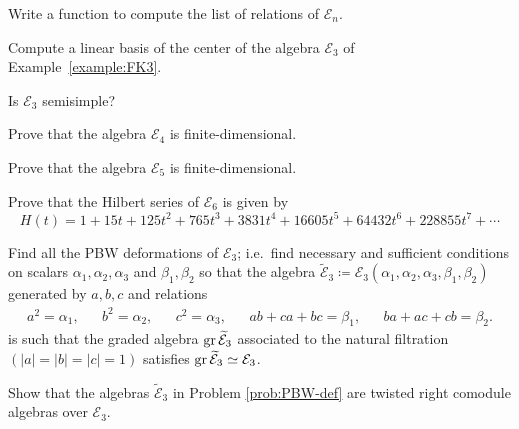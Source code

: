 \begin{prob}
Write a function to compute the list of relations of $\mathcal{E}_n$.
\end{prob}

\begin{prob}
	Compute a linear basis of the center of the algebra $\mathcal{E}_3$ of
	Example~\ref{example:FK3}. 
\end{prob}

\begin{prob}
	Is $\mathcal{E}_3$ semisimple?
\end{prob}

\begin{prob}
	\label{problem:FK4}
	Prove that the algebra $\mathcal{E}_4$ is finite-dimensional.
\end{prob}

\begin{prob}
	\label{problem:FK5}
	Prove that the algebra $\mathcal{E}_5$ is finite-dimensional.
\end{prob}

\begin{prob}
	\label{problem:FK6}
	Prove that the Hilbert series of $\mathcal{E}_6$ is given by
	\[
	H(t)=1+15t+125t^2+765t^3+3831t^4+16605t^5+64432t^6+228855t^7+\cdots
	\]
\end{prob}

\begin{prob}\label{prob:PBW-def}
Find all the PBW deformations of $\mathcal{E}_3$; i.e.~find necessary and sufficient conditions on scalars $\alpha_1,\alpha_2,\alpha_3$ and $\beta_1,\beta_2$ so that the algebra $\widetilde{\mathcal{E}}_3\coloneqq \mathcal{E}_3(\alpha_1,\alpha_2,\alpha_3,\beta_1,\beta_2)$ generated by $a,b,c$ and relations
\begin{align*}
a^2=\alpha_1,&& 
b^2=\alpha_2,&&
c^2=\alpha_3,&&
ab+ca+bc=\beta_1,&&
ba+ac+cb=\beta_2.
\end{align*}
is such that the graded algebra $\operatorname{gr} \widetilde{\mathcal{E}}_3$  associated  to the natural filtration $(|a|=|b|=|c|=1)$ satisfies  $\operatorname{gr} \widetilde{\mathcal{E}}_3\simeq \mathcal{E}_3$.
\end{prob}



\begin{prob}
	Show that the algebras $\widetilde{\mathcal{E}}_3$ in Problem \ref{prob:PBW-def} are twisted right comodule algebras over $\mathcal{E}_3$.
\end{prob}



